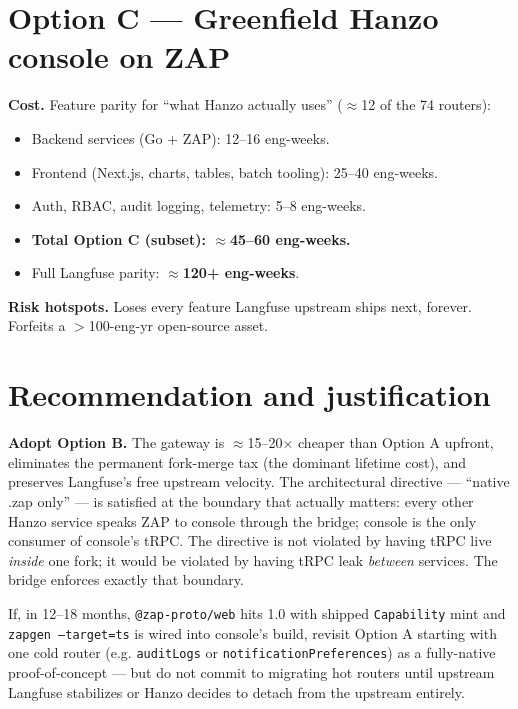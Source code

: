 \documentclass[11pt,letterpaper]{article}
\begin{document}
\section{Option C --- Greenfield Hanzo console on ZAP}
\textbf{Cost.} Feature parity for ``what Hanzo actually uses'' ($\approx$12 of the 74 routers):
\begin{itemize}[leftmargin=1.2em,itemsep=2pt]
  \item Backend services (Go + ZAP): 12--16 eng-weeks.
  \item Frontend (Next.js, charts, tables, batch tooling): 25--40 eng-weeks.
  \item Auth, RBAC, audit logging, telemetry: 5--8 eng-weeks.
  \item \textbf{Total Option C (subset): $\approx$45--60 eng-weeks.}
  \item Full Langfuse parity: \textbf{$\approx$120+ eng-weeks}.
\end{itemize}

\textbf{Risk hotspots.} Loses every feature Langfuse upstream ships next, forever. Forfeits a $>$100-eng-yr open-source asset.

\section{Recommendation and justification}
\textbf{Adopt Option B.} The gateway is $\approx$15--20$\times$ cheaper than Option A upfront, eliminates the permanent fork-merge tax (the dominant lifetime cost), and preserves Langfuse's free upstream velocity. The architectural directive --- ``native .zap only'' --- is satisfied at the boundary that actually matters: every other Hanzo service speaks ZAP to console through the bridge; console is the only consumer of console's tRPC. The directive is not violated by having tRPC live \emph{inside} one fork; it would be violated by having tRPC leak \emph{between} services. The bridge enforces exactly that boundary.

If, in 12--18 months, \texttt{@zap-proto/web} hits 1.0 with shipped \texttt{Capability} mint and \texttt{zapgen --target=ts} is wired into console's build, revisit Option A starting with one cold router (e.g. \texttt{auditLogs} or \texttt{notificationPreferences}) as a fully-native proof-of-concept --- but do not commit to migrating hot routers until upstream Langfuse stabilizes or Hanzo decides to detach from the upstream entirely.
\end{document}
